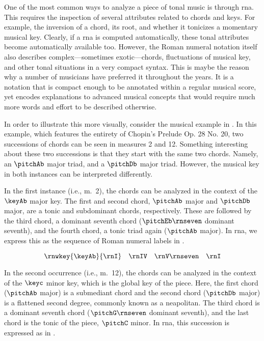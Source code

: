 
One of the most common ways to analyze a piece of tonal
music is through \gls{rna}. This requires the inspection of
several attributes related to chords and keys. For example,
the inversion of a chord, its root, and whether it tonicizes
a momentary musical key. Clearly, if a \gls{rna} is computed
automatically, these tonal attributes become automatically
available too. However, the Roman numeral notation itself
also describes complex---sometimes exotic---chords,
fluctuations of musical key, and other tonal situations in a
very compact syntax. This is maybe the reason why a number
of musicians have preferred it throughout the years. It is a
notation that is compact enough to be annotated within a
regular musical score, yet encodes explanations to advanced
musical concepts that would require much more words and
effort to be described otherwise.

In order to illustrate this more visually, consider the
musical example in . In this
example, which features the entirety of Chopin's Prelude Op.
28 No. 20, two successions of chords can be seen in measures
2 and 12. Something interesting about these two successions
is that they start with the same two chords. Namely, an
$\pitchAb$ major triad, and a $\pitchDb$ major triad.
However, the musical key in both instances can be
interpreted differently.


In the first instance (i.e., m.~2), the chords can be
analyzed in the context of the $\keyAb$ major key. The first
and second chord, $\pitchAb$ major and $\pitchDb$ major, are
a tonic and subdominant chords, respectively. These are
followed by the third chord, a dominant seventh chord
($\pitchEb\rnseven$ dominant seventh), and the fourth chord,
a tonic triad again ($\pitchAb$ major). In \gls{rna}, we
express this as the sequence of Roman numeral labels in
.

\begin{equation}
    \label{eq:succession1}
    \rnwkey{\keyAb}{\rnI} \quad \rnIV \quad \rnV\rnseven \quad \rnI
\end{equation}

In the second occurrence (i.e., m.~12), the chords can be
analyzed in the context of the $\keyc$ minor key, which is
the global key of the piece. Here, the first chord
($\pitchAb$ major) is a submediant chord and the second
chord ($\pitchDb$ major) is a flattened second degree,
commonly known as a \gls{neapolitan}. The third chord is a
dominant seventh chord ($\pitchG\rnseven$ dominant seventh),
and the last chord is the tonic of the piece, $\pitchC$
minor. In \gls{rna}, this succession is expressed as in
.

